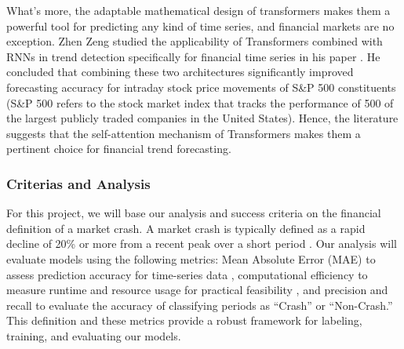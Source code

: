\documentclass[12pt, letterpaper]{article}
\begin{document}
What's more, the adaptable mathematical design of transformers makes them a powerful tool for predicting any kind of time series, and financial markets are no exception. Zhen Zeng studied the applicability of Transformers combined with RNNs in trend detection specifically for financial time series in his paper \cite{zeng2023financial}. He concluded that combining these two architectures significantly improved forecasting accuracy for intraday stock price movements of S\&P 500 constituents (S\&P 500 refers to the stock market index that tracks the performance of 500 of the largest publicly traded companies in the United States). Hence, the literature suggests that the self-attention mechanism of Transformers makes them a pertinent choice for financial trend forecasting.

\subsubsection*{Criterias and Analysis}
For this project, we will base our analysis and success criteria on the financial definition of a market crash. A market crash is typically defined as a rapid decline of 20\% or more from a recent peak over a short period \cite{Fonville, Investo}. Our analysis will evaluate models using the following metrics: Mean Absolute Error (MAE) to assess prediction accuracy for time-series data \cite{hyndman2018}, computational efficiency to measure runtime and resource usage for practical feasibility \cite{lim2021temporal}, and precision and recall to evaluate the accuracy of classifying periods as “Crash” or “Non-Crash.” This definition and these metrics provide a robust framework for labeling, training, and evaluating our models.



\pagebreak

\printbibliography
\end{document}
